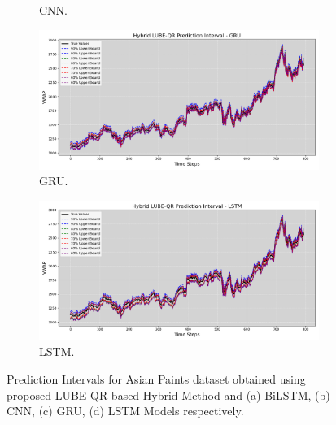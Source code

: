 \begin{figure}[H]
\begin{minipage}{0.49\textwidth}
\begin{subfigure}[b]{\textwidth}
            \caption{CNN.}
        \end{subfigure}
        \begin{subfigure}[b]{\textwidth}
            \centering
            \includegraphics[width=\textwidth]{Chap03/figs/AsianPaint_Hybrid_LUBE_QR_AllConfidence_GRU.png}
            \caption{GRU.}
        \end{subfigure}
        \begin{subfigure}[b]{\textwidth}
            \centering
            \includegraphics[width=\textwidth]{Chap03/figs/AsianPaint_Hybrid_LUBE_QR_AllConfidence_LSTM.png}
            \caption{LSTM.}
        \end{subfigure}
        \caption{Prediction Intervals for Asian Paints dataset obtained using proposed LUBE-QR based Hybrid Method and (a) BiLSTM, (b) CNN, (c) GRU, (d) LSTM Models respectively.}
        \label{fig 5.2}
    \end{minipage}
\end{figure}


